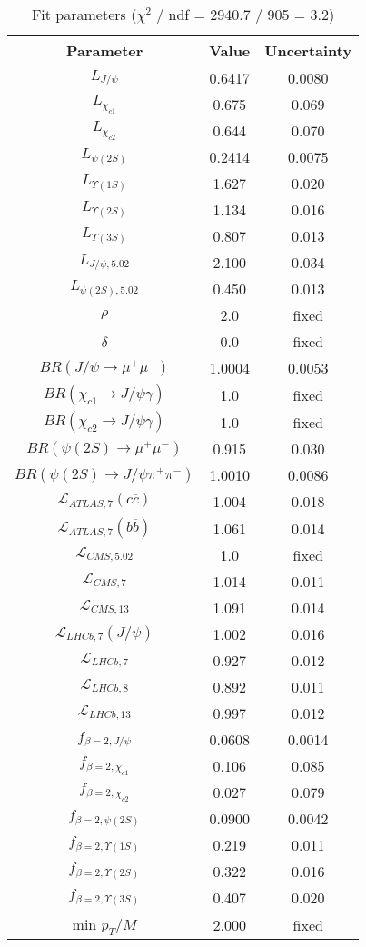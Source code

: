 \begin{table}[h!]
\centering
\begin{tabular}{c|c|c}
Parameter & Value & Uncertainty \\
\hline
$L_{J/\psi}$ & 0.6417 & 0.0080 \\
$L_{\chi_{c1}}$ & 0.675 & 0.069 \\
$L_{\chi_{c2}}$ & 0.644 & 0.070 \\
$L_{\psi(2S)}$ & 0.2414 & 0.0075 \\
$L_{\Upsilon(1S)}$ & 1.627 & 0.020 \\
$L_{\Upsilon(2S)}$ & 1.134 & 0.016 \\
$L_{\Upsilon(3S)}$ & 0.807 & 0.013 \\
$L_{J/\psi,5.02}$ & 2.100 & 0.034 \\
$L_{\psi(2S),5.02}$ & 0.450 & 0.013 \\
$\rho$ & 2.0 & fixed \\
$\delta$ & 0.0 & fixed \\
$BR(J/\psi\rightarrow\mu^+\mu^-)$ & 1.0004 & 0.0053 \\
$BR(\chi_{c1}\rightarrow J/\psi\gamma)$ & 1.0 & fixed \\
$BR(\chi_{c2}\rightarrow J/\psi\gamma)$ & 1.0 & fixed \\
$BR(\psi(2S)\rightarrow\mu^+\mu^-)$ & 0.915 & 0.030 \\
$BR(\psi(2S)\rightarrow J/\psi\pi^+\pi^-)$ & 1.0010 & 0.0086 \\
$\mathcal L_{ATLAS,7}(c\overline c)$ & 1.004 & 0.018 \\
$\mathcal L_{ATLAS,7}(b\overline b)$ & 1.061 & 0.014 \\
$\mathcal L_{CMS,5.02}$ & 1.0 & fixed \\
$\mathcal L_{CMS,7}$ & 1.014 & 0.011 \\
$\mathcal L_{CMS,13}$ & 1.091 & 0.014 \\
$\mathcal L_{LHCb,7}(J/\psi)$ & 1.002 & 0.016 \\
$\mathcal L_{LHCb,7}$ & 0.927 & 0.012 \\
$\mathcal L_{LHCb,8}$ & 0.892 & 0.011 \\
$\mathcal L_{LHCb,13}$ & 0.997 & 0.012 \\
$f_{\beta=2,J/\psi}$ & 0.0608 & 0.0014 \\
$f_{\beta=2,\chi_{c1}}$ & 0.106 & 0.085 \\
$f_{\beta=2,\chi_{c2}}$ & 0.027 & 0.079 \\
$f_{\beta=2,\psi(2S)}$ & 0.0900 & 0.0042 \\
$f_{\beta=2,\Upsilon(1S)}$ & 0.219 & 0.011 \\
$f_{\beta=2,\Upsilon(2S)}$ & 0.322 & 0.016 \\
$f_{\beta=2,\Upsilon(3S)}$ & 0.407 & 0.020 \\
min $p_T/M$ & 2.000 & fixed \\
\end{tabular}
\caption{Fit parameters ($\chi^2$ / ndf = 2940.7 / 905 = 3.2)}
\end{table}
